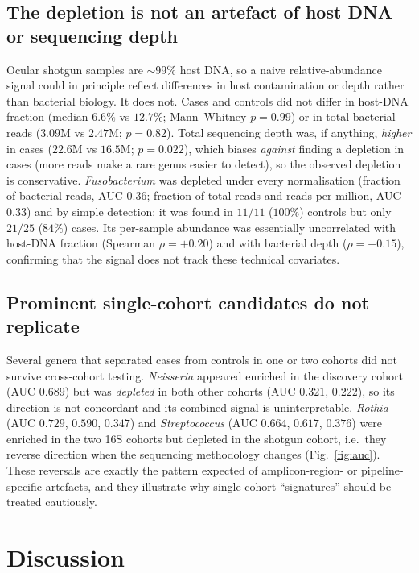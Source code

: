\documentclass[11pt]{article}
\begin{document}
\subsection{The depletion is not an artefact of host DNA or sequencing depth}
Ocular shotgun samples are $\sim$99\% host DNA, so a naive relative-abundance
signal could in principle reflect differences in host contamination or depth
rather than bacterial biology. It does not. Cases and controls did not differ in
host-DNA fraction (median $6.6\%$ vs $12.7\%$; Mann--Whitney $p=0.99$) or in total
bacterial reads ($3.09\text{M}$ vs $2.47\text{M}$; $p=0.82$). Total sequencing
depth was, if anything, \emph{higher} in cases ($22.6\text{M}$ vs $16.5\text{M}$;
$p=0.022$), which biases \emph{against} finding a depletion in cases (more reads
make a rare genus easier to detect), so the observed depletion is conservative.
\textit{Fusobacterium} was depleted under every normalisation (fraction of
bacterial reads, AUC $0.36$; fraction of total reads and reads-per-million, AUC
$0.33$) and by simple detection: it was found in $11/11$ ($100\%$) controls but
only $21/25$ ($84\%$) cases. Its per-sample abundance was essentially uncorrelated
with host-DNA fraction (Spearman $\rho=+0.20$) and with bacterial depth
($\rho=-0.15$), confirming that the signal does not track these technical
covariates.

\subsection{Prominent single-cohort candidates do not replicate}
Several genera that separated cases from controls in one or two cohorts did not
survive cross-cohort testing. \textit{Neisseria} appeared enriched in the discovery cohort
(AUC $0.689$) but was \emph{depleted} in both other cohorts (AUC $0.321$,
$0.222$), so its direction is not concordant and its combined signal is
uninterpretable. \textit{Rothia} (AUC $0.729$, $0.590$, $0.347$) and
\textit{Streptococcus} (AUC $0.664$, $0.617$, $0.376$) were enriched in the two
16S cohorts but depleted in the shotgun cohort, i.e.\ they reverse direction when
the sequencing methodology changes (Fig.~\ref{fig:auc}). These reversals are
exactly the pattern expected of amplicon-region- or pipeline-specific artefacts,
and they illustrate why single-cohort ``signatures'' should be treated cautiously.

\section{Discussion}\label{sec:disc}
\end{document}
